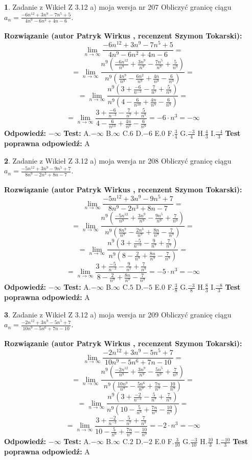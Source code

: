 \documentclass[12pt, a4paper]{article}
\theoremstyle{definition} %
\newtheorem{zad}{}
\newcommand{\zadStart}[1]{\begin{zad}#1\newline}
\newcommand{\zadStop}{\end{zad}}
\newcommand{\rozwStart}[2]{\noindent \textbf{Rozwiązanie (autor #1 , recenzent #2): }\newline}
\newcommand{\rozwStop}{\newline}
\newcommand{\odpStart}{\noindent \textbf{Odpowiedź:}\newline}
\newcommand{\odpStop}{\newline}
\newcommand{\testStart}{\noindent \textbf{Test:}\newline}
\newcommand{\testStop}{\newline}
\newcommand{\kluczStart}{\noindent \textbf{Test poprawna odpowiedź:}\newline}
\newcommand{\kluczStop}{\newline}
\begin{document}
\zadStart{Zadanie z Wikieł Z 3.12 a) moja wersja nr 207}
Obliczyć granicę ciągu $a_{n}=\frac{-6n^{12}+3n^{9}-7n^{5}+5}{4n^{9}-6n^{2}+4n-6}$.
\zadStop
\rozwStart{Patryk Wirkus}{Szymon Tokarski}
$$\lim\limits_{n\to\infty}\frac{-6n^{12}+3n^{9}-7n^{5}+5}{4n^{9}-6n^{2}+4n-6}=$$
$$=\lim\limits_{n\to\infty}\frac{n^{9}\left(\frac{-6n^{12}}{n^{9}}+\frac{3n^{9}}{n^{9}}-\frac{7n^{5}}{n^{9}}+\frac{5}{n^{9}}\right)}{n^{9}\left(\frac{4n^{9}}{n^{9}}-\frac{6n^{2}}{n^{9}}+\frac{4n}{n^{9}}-\frac{6}{n^{9}}\right)}=$$
$$=\lim\limits_{n\to\infty}\frac{n^{9}\left(3+\frac{-6}{n^{-3}}-\frac{7}{n^{7}}+\frac{5}{n^{9}}\right)}
{n^{9}\left(4-\frac{6}{n^{10}}+\frac{4n}{n^{9}}-\frac{6}{n^{9}}\right)}=$$
$$=\lim\limits_{n\to\infty}\frac{3+\frac{-6}{n^{-3}}-\frac{7}{n^{7}}+\frac{5}{n^{9}}}{4-\frac{6}{n^{10}}+\frac{4n}{n^{9}}-\frac{6}{n^{9}}}=-6\cdot n^{3} = -\infty$$
\rozwStop
\odpStart
$-\infty$
\odpStop
\testStart
A.$-\infty$
B.$\infty$
C.$6$
D.$-6$
E.$0$
F.$\frac{3}{4}$
G.$\frac{-3}{4}$
H.$\frac{4}{3}$
I.$\frac{-4}{3}$
\testStop
\kluczStart
A
\kluczStop



\zadStart{Zadanie z Wikieł Z 3.12 a) moja wersja nr 208}
Obliczyć granicę ciągu $a_{n}=\frac{-5n^{12}+3n^{9}-9n^{5}+7}{8n^{9}-2n^{3}+8n-7}$.
\zadStop
\rozwStart{Patryk Wirkus}{Szymon Tokarski}
$$\lim\limits_{n\to\infty}\frac{-5n^{12}+3n^{9}-9n^{5}+7}{8n^{9}-2n^{3}+8n-7}=$$
$$=\lim\limits_{n\to\infty}\frac{n^{9}\left(\frac{-5n^{12}}{n^{9}}+\frac{3n^{9}}{n^{9}}-\frac{9n^{5}}{n^{9}}+\frac{7}{n^{9}}\right)}{n^{9}\left(\frac{8n^{9}}{n^{9}}-\frac{2n^{3}}{n^{9}}+\frac{8n}{n^{9}}-\frac{7}{n^{9}}\right)}=$$
$$=\lim\limits_{n\to\infty}\frac{n^{9}\left(3+\frac{-5}{n^{-3}}-\frac{9}{n^{7}}+\frac{7}{n^{9}}\right)}
{n^{9}\left(8-\frac{2}{n^{9}}+\frac{8n}{n^{9}}-\frac{7}{n^{9}}\right)}=$$
$$=\lim\limits_{n\to\infty}\frac{3+\frac{-5}{n^{-3}}-\frac{9}{n^{7}}+\frac{7}{n^{9}}}{8-\frac{2}{n^{9}}+\frac{8n}{n^{9}}-\frac{7}{n^{9}}}=-5\cdot n^{3} = -\infty$$
\rozwStop
\odpStart
$-\infty$
\odpStop
\testStart
A.$-\infty$
B.$\infty$
C.$5$
D.$-5$
E.$0$
F.$\frac{3}{8}$
G.$\frac{-3}{8}$
H.$\frac{8}{3}$
I.$\frac{-8}{3}$
\testStop
\kluczStart
A
\kluczStop



\zadStart{Zadanie z Wikieł Z 3.12 a) moja wersja nr 209}
Obliczyć granicę ciągu $a_{n}=\frac{-2n^{12}+3n^{9}-5n^{5}+7}{10n^{9}-5n^{6}+7n-10}$.
\zadStop
\rozwStart{Patryk Wirkus}{Szymon Tokarski}
$$\lim\limits_{n\to\infty}\frac{-2n^{12}+3n^{9}-5n^{5}+7}{10n^{9}-5n^{6}+7n-10}=$$
$$=\lim\limits_{n\to\infty}\frac{n^{9}\left(\frac{-2n^{12}}{n^{9}}+\frac{3n^{9}}{n^{9}}-\frac{5n^{5}}{n^{9}}+\frac{7}{n^{9}}\right)}{n^{9}\left(\frac{10n^{9}}{n^{9}}-\frac{5n^{6}}{n^{9}}+\frac{7n}{n^{9}}-\frac{10}{n^{9}}\right)}=$$
$$=\lim\limits_{n\to\infty}\frac{n^{9}\left(3+\frac{-2}{n^{-3}}-\frac{5}{n^{7}}+\frac{7}{n^{9}}\right)}
{n^{9}\left(10-\frac{5}{n^{6}}+\frac{7n}{n^{9}}-\frac{10}{n^{9}}\right)}=$$
$$=\lim\limits_{n\to\infty}\frac{3+\frac{-2}{n^{-3}}-\frac{5}{n^{7}}+\frac{7}{n^{9}}}{10-\frac{5}{n^{6}}+\frac{7n}{n^{9}}-\frac{10}{n^{9}}}=-2\cdot n^{3} = -\infty$$
\rozwStop
\odpStart
$-\infty$
\odpStop
\testStart
A.$-\infty$
B.$\infty$
C.$2$
D.$-2$
E.$0$
F.$\frac{3}{10}$
G.$\frac{-3}{10}$
H.$\frac{10}{3}$
I.$\frac{-10}{3}$
\testStop
\kluczStart
A
\kluczStop
\end{document}
